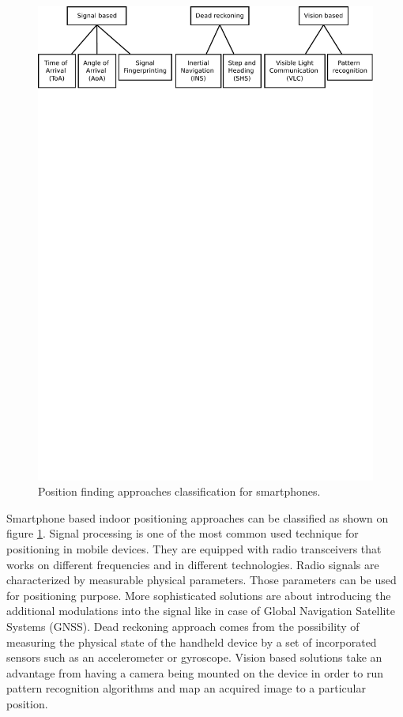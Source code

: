 \documentclass[../main.tex]{subfiles}
\begin{document}
\begin{figure}[!htbp]
\includegraphics[width=\textwidth, trim={0 23cm 0 0},clip]{pictures/smartphone_localization_approaches.pdf}
\centering
\caption{Position finding approaches classification for smartphones.\cite{inertial_navi_velocity_model}}
\label{fig:smartphone_localization_approaches}
\end{figure}

Smartphone based indoor positioning approaches can be classified as shown on figure \ref{fig:smartphone_localization_approaches}. Signal processing is one of the most common used technique for positioning in mobile devices. They are equipped with radio transceivers that works on different frequencies and in different technologies. Radio signals are characterized by measurable physical parameters. Those parameters can be used for positioning purpose. More sophisticated solutions are about introducing the additional modulations into the signal like in case of Global Navigation Satellite Systems (GNSS)\cite{GPS_retransmission_differential}. Dead reckoning approach comes from the possibility of measuring the physical state of the handheld device by a set of incorporated sensors such as an accelerometer or gyroscope. Vision based solutions take an advantage from having a camera being mounted on the device in order to run pattern recognition algorithms and map an acquired image to a particular position.
\end{document}
